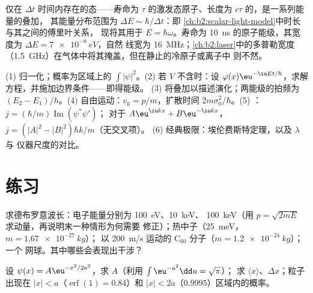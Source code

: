 \begin{remark}[能量与时间]\label{rem:b2:schrodinger-wave-functions:energytime}
仅在 $\Delta t$ 时间内存在的态——寿命为
$\tau$ 的激发态原子、长度为 $c\tau$ 的，是一系列能量的叠加，
其能量分布范围为 $\Delta E \sim \hbar/\Delta t$：即
\cref{ch:b2:scalar-light-model}中时长与其之间的傅里叶关系，
现将其用于 $E = \hbar\omega$。寿命为
\qty{10}{ns} 的原子能级，其宽度为 $\Delta E = \qty{7e-8}{eV}$，自然
线宽为 \qty{16}{MHz}；\cref{ch:b2:laser}中的多普勒宽度
（\qty{1.5}{GHz}）在气体中将其掩盖，但在静止的冷原子或离子中
则不然。
\end{remark}

\begin{method}[波函数的应用]\label{meth:b2:schrodinger-wave-functions:method}
(1) 归一化；概率为区域上的 $\int|\psi|^2$。(2)
若 $V$ 不含时：设 $\varphi(x)\eu^{-\iu Et/\hbar}$，求解
方程，并施加边界条件——即得能级。
(3) 将叠加以描述演化；两能级的拍频为
$(E_2 - E_1)/h$。(4) 自由运动：$v_{\text{g}} = p/m$，扩散时间
$2m\sigma_0^2/\hbar$。(5) ：$j = (\hbar/m)\operatorname{Im}(\psi^*\psi')$；
对于 $A\eu^{\iu kx} + B\eu^{-\iu kx}$，$j = (|A|^2 - |B|^2)\hbar k/m$（无交叉项）。
(6) 经典极限：埃伦费斯特定理，以及 $\lambda$ 与
仪器尺度的对比。
\end{method}

\section{练习}

\begin{exercise}[$\star$]\label{exo:b2:schrodinger-wave-functions:1}
求德布罗意波长：电子能量分别为 \qty{100}{eV}、\qty{10}{keV}、
\qty{100}{keV}（用 $p = \sqrt{2mE}$ 求动量，再说明末一种情形为何需要
修正）；热中子（\qty{25}{meV}，$m = \qty{1.67e-27}{kg}$）；
以 \qty{200}{m/s} 运动的 C$_{60}$ 分子（$m = \qty{1.2e-24}{kg}$）；一个
网球。其中哪些会表现出干涉？
\end{exercise}

\begin{exercise}[$\star$]\label{exo:b2:schrodinger-wave-functions:2}
设 $\psi(x) = A\eu^{-x^2/2a^2}$，求 $A$（利用 $\int\eu^{-u^2}\dd u = \sqrt\pi$）；
求 $\langle x\rangle$、$\Delta x$；粒子出现在
$|x| < a$（$\operatorname{erf}(1) = 0.84$）和 $|x| < 2a$（$0.9995$）区域内的概率。
\end{exercise}

